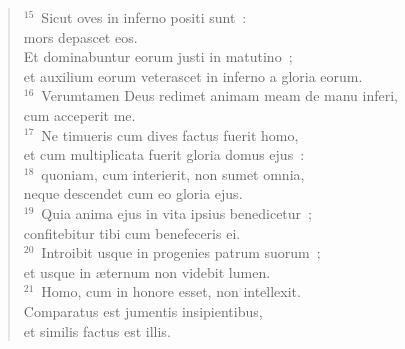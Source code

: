 \begin{flushleft}
\begin{verse}
${}^{15}$~Sicut oves in inferno positi sunt~:\\ mors depascet eos.\\ Et dominabuntur eorum justi in matutino~;\\ et auxilium eorum veterascet in inferno a gloria eorum.\\
${}^{16}$~Verumtamen Deus redimet animam meam de manu inferi,\\ cum acceperit me.\\
${}^{17}$~Ne timueris cum dives factus fuerit homo,\\ et cum multiplicata fuerit gloria domus ejus~:\\
${}^{18}$~quoniam, cum interierit, non sumet omnia,\\ neque descendet cum eo gloria ejus.\\
${}^{19}$~Quia anima ejus in vita ipsius benedicetur~;\\ confitebitur tibi cum benefeceris ei.\\
${}^{20}$~Introibit usque in progenies patrum suorum~;\\ et usque in \ae ternum non videbit lumen.\\
${}^{21}$~Homo, cum in honore esset, non intellexit.\\ Comparatus est jumentis insipientibus,\\ et similis factus est illis.\end{verse}\end{flushleft}



